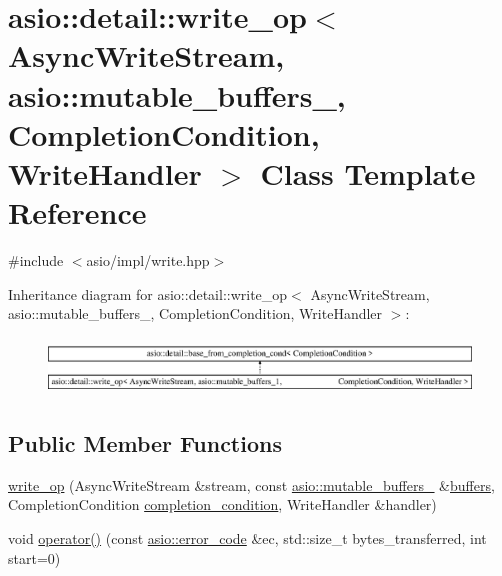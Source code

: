 \hypertarget{classasio_1_1detail_1_1write__op_3_01_async_write_stream_00_01asio_1_1mutable__buffers__1_00_01_203e79af9e8ed472722d2a863f7168cc}{}\section{asio\+:\+:detail\+:\+:write\+\_\+op$<$ Async\+Write\+Stream, asio\+:\+:mutable\+\_\+buffers\+\_, Completion\+Condition, Write\+Handler $>$ Class Template Reference}
\label{classasio_1_1detail_1_1write__op_3_01_async_write_stream_00_01asio_1_1mutable__buffers__1_00_01_203e79af9e8ed472722d2a863f7168cc}


{\ttfamily \#include $<$asio/impl/write.\+hpp$>$}

Inheritance diagram for asio\+:\+:detail\+:\+:write\+\_\+op$<$ Async\+Write\+Stream, asio\+:\+:mutable\+\_\+buffers\+\_, Completion\+Condition, Write\+Handler $>$\+:\begin{figure}[H]
\begin{center}
\leavevmode
\includegraphics[height=1.513514cm]{classasio_1_1detail_1_1write__op_3_01_async_write_stream_00_01asio_1_1mutable__buffers__1_00_01_203e79af9e8ed472722d2a863f7168cc}
\end{center}
\end{figure}
\subsection*{Public Member Functions}
\begin{DoxyCompactItemize}
\item 
\hyperlink{classasio_1_1detail_1_1write__op_3_01_async_write_stream_00_01asio_1_1mutable__buffers__1_00_01_203e79af9e8ed472722d2a863f7168cc_ab978d16ce91bafdd7b8940a35f8f3392}{write\+\_\+op} (Async\+Write\+Stream \&stream, const \hyperlink{classasio_1_1mutable__buffers__1}{asio\+::mutable\+\_\+buffers\+\_} \&\hyperlink{group__async__read_ga54dede45c3175148a77fe6635222c47d}{buffers}, Completion\+Condition \hyperlink{group__async__read_gae2e215d5013596cc2b385bb6c13fa518}{completion\+\_\+condition}, Write\+Handler \&handler)
\item 
void \hyperlink{classasio_1_1detail_1_1write__op_3_01_async_write_stream_00_01asio_1_1mutable__buffers__1_00_01_203e79af9e8ed472722d2a863f7168cc_a5fab8154123ff86d75d809de044c2a35}{operator()} (const \hyperlink{classasio_1_1error__code}{asio\+::error\+\_\+code} \&ec, std\+::size\+\_\+t bytes\+\_\+transferred, int start=0)
\end{DoxyCompactItemize}
